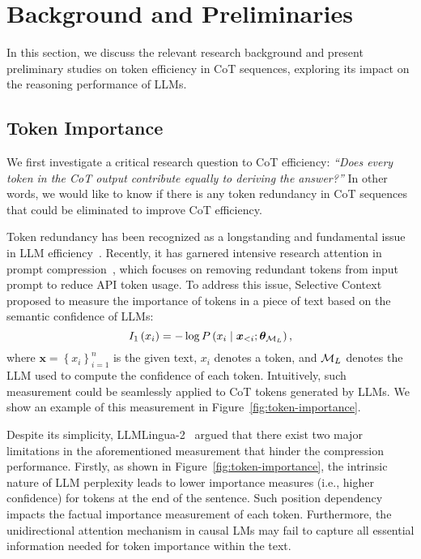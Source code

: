 \section{Background and Preliminaries}
\label{sec:preliminaries}

In this section, we discuss the relevant research background and present preliminary studies on token efficiency in CoT sequences, exploring its impact on the reasoning performance of LLMs.

\subsection{Token Importance}
\label{sec:token-importance}

We first investigate a critical research question to CoT efficiency: \textit{``Does every token in the CoT output contribute equally to deriving the answer?''} In other words, we would like to know if there is any token redundancy in CoT sequences that could be eliminated to improve CoT efficiency.

Token redundancy has been recognized as a longstanding and fundamental issue in LLM efficiency~\cite{hou:2022tokendropbert, zhang2023h2o, lin2024criticaltokenpretrain, Chen:2024FastV}. Recently, it has garnered intensive research attention in prompt compression~\cite{li:2023selective, jiang2023:llmlingua, pan:2024llmlingua2}, which focuses on removing redundant tokens from input prompt to reduce API token usage. To address this issue, Selective Context~\cite{li:2023selective} proposed to measure the importance of tokens in a piece of text based on the semantic confidence of LLMs:
\begin{equation}
I_1\left(x_i\right)=-\log P\left(x_i \mid \bm{x}_{<{i}}; \bm{\theta}_{\mathcal{M}_L}\right),
\label{eq:selectivecontext}
\end{equation}
where $\boldsymbol{x}=\left\{x_i\right\}_{i=1}^{n}$ is the given text, $x_i$ denotes a token, and $\mathcal{M}_L$ denotes the LLM used to compute the confidence of each token. Intuitively, such measurement could be seamlessly applied to CoT tokens generated by LLMs. We show an example of this measurement in Figure~\ref{fig:token-importance}.



Despite its simplicity, LLMLingua-2~\cite{pan:2024llmlingua2} argued that there exist two major limitations in the aforementioned measurement that hinder the compression performance. Firstly, as shown in Figure~\ref{fig:token-importance}, the intrinsic nature of LLM perplexity leads to lower importance measures (i.e., higher confidence) for tokens at the end of the sentence. Such position dependency impacts the factual importance measurement of each token. Furthermore, the unidirectional attention mechanism in causal LMs may fail to capture all essential information needed for token importance within the text. 

